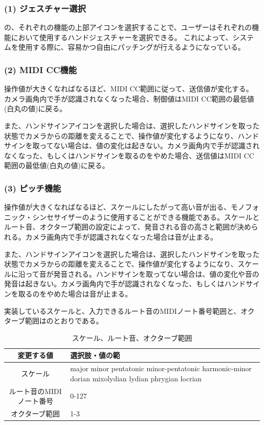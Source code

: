 \subsubsection*{(1) ジェスチャー選択}
の、それぞれの機能の上部アイコンを選択することで、ユーザーはそれぞれの機能において使用するハンドジェスチャーを選択できる。
これによって、システムを使用する際に、容易かつ自由にパッチングが行えるようになっている。

\subsubsection*{(2) MIDI CC機能}
操作値が大きくなればなるほど、MIDI CC範囲に従って、送信値が変化する。カメラ画角内で手が認識されなくなった場合、制御値はMIDI CC範囲の最低値(白丸の値)に戻る。

また、ハンドサインアイコンを選択した場合は、選択したハンドサインを取った状態でカメラからの距離を変えることで、操作値が変化するようになり、ハンドサインを取ってない場合は、値の変化は起きない。カメラ画角内で手が認識されなくなった、もしくはハンドサインを取るのをやめた場合、送信値はMIDI CC範囲の最低値(白丸の値)に戻る。

\subsubsection*{(3) ピッチ機能}
操作値が大きくなればなるほど、スケールにしたがって高い音が出る、モノフォニック・シンセサイザーのように使用することができる機能である。スケールとルート音、オクターブ範囲の設定によって、発音される音の高さと範囲が決められる。カメラ画角内で手が認識されなくなった場合は音が止まる。

また、ハンドサインアイコンを選択した場合は、選択したハンドサインを取った状態でカメラからの距離を変えることで、操作値が変化するようになり、スケールに沿って音が発音される。ハンドサインを取ってない場合は、値の変化や音の発音は起きない。カメラ画角内で手が認識されなくなった、もしくはハンドサインを取るのをやめた場合は音が止まる。

実装しているスケールと、入力できるルート音のMIDIノート番号範囲と、オクターブ範囲はのとおりである。

\begin{table}[tb]
	\centering
	\small
	\caption{スケール、ルート音、オクターブ範囲}\label{tab:scale}
	\begin{tabular}{c|p{3cm}}
		\hline
		\hline
		変更する値          & 選択肢・値の範                                                                                          \\
		\hline
		スケール & major minor pentatonic minor-pentatonic harmonic-minor dorian mixolydian lydian phrygian locrian \\
		\hline
		ルート音のMIDIノート番号 & 0-127                                                                                            \\
		\hline
		オクターブ範囲        & 1-3                                                                                              \\
		\hline
	\end{tabular}
\end{table}




